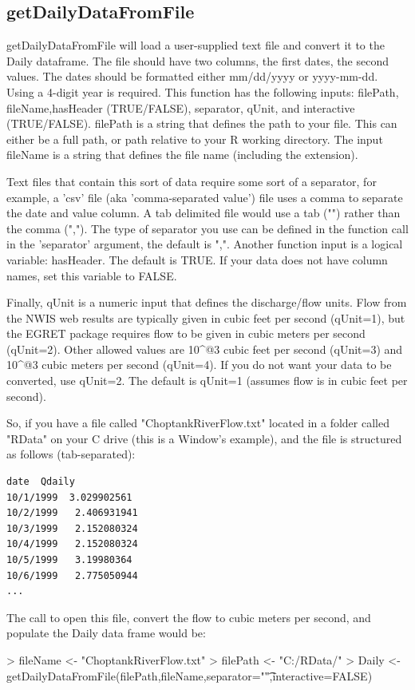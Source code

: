 \documentclass[a4paper,11pt]{article}
\begin{document}
\subsection{getDailyDataFromFile}
getDailyDataFromFile will load a user-supplied text file and convert it to the Daily dataframe. The file should have two columns, the first dates, the second values.  The dates should be formatted either mm/dd/yyyy or yyyy-mm-dd. Using a 4-digit year is required. This function has the following inputs: filePath, fileName,hasHeader (TRUE/FALSE), separator, qUnit, and interactive (TRUE/FALSE). filePath is a string that defines the path to your file. This can either be a full path, or path relative to your R working directory. The input fileName is a string that defines the file name (including the extension).

Text files that contain this sort of data require some sort of a separator, for example, a 'csv' file (aka 'comma-separated value') file uses a comma to separate the date and value column. A tab delimited file would use a tab ("\verb@\t@") rather than the comma (","). The type of separator you use can be defined in the function call in the 'separator' argument, the default is ",". Another function input is a logical variable: hasHeader.  The default is TRUE. If your data does not have column names, set this variable to FALSE.

Finally, qUnit is a numeric input that defines the discharge/flow units. Flow from the NWIS web results are typically given in cubic feet per second (qUnit=1), but the EGRET package requires flow to be given in cubic meters per second (qUnit=2). Other allowed values are 10\verb@^@3 cubic feet per second (qUnit=3) and 10\verb@^@3 cubic meters per second (qUnit=4). If you do not want your data to be converted, use qUnit=2. The default is qUnit=1 (assumes flow is in cubic feet per second).

So, if you have a file called "ChoptankRiverFlow.txt" located in a folder called "RData" on your C drive (this is a Window's example), and the file is structured as follows (tab-separated):
\begin{verbatim}
date  Qdaily
10/1/1999  3.029902561
10/2/1999	2.406931941
10/3/1999	2.152080324
10/4/1999	2.152080324
10/5/1999	3.19980364
10/6/1999	2.775050944
...
\end{verbatim}

The call to open this file, convert the flow to cubic meters per second, and populate the Daily data frame would be:
\begin{Schunk}
\begin{Sinput}
> fileName <- "ChoptankRiverFlow.txt"
> filePath <-  "C:/RData/"
> Daily <- getDailyDataFromFile(filePath,fileName,separator="\t",interactive=FALSE)
\end{Sinput}
\end{Schunk}
\end{document}
